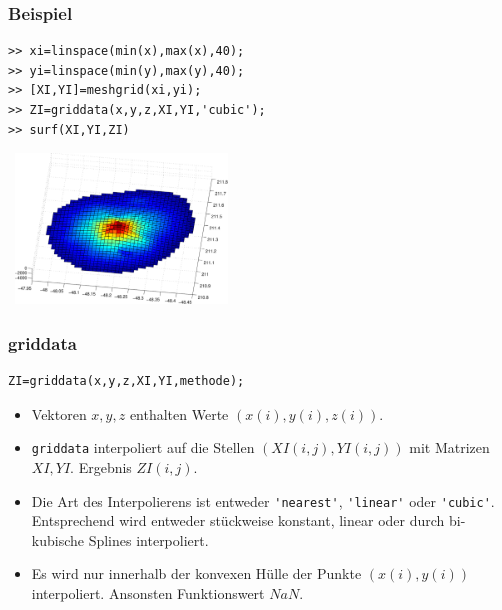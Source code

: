 \begin{frame}[fragile]\frametitle{Beispiel}
\begin{lstlisting}
>> xi=linspace(min(x),max(x),40);
>> yi=linspace(min(y),max(y),40);
>> [XI,YI]=meshgrid(xi,yi);
>> ZI=griddata(x,y,z,XI,YI,'cubic');
>> surf(XI,YI,ZI)
\end{lstlisting}
\begin{center}
\includegraphics[width=6cm, height=4cm]{./figures/beispiel_scattered_data_plot}
\end{center}
\end{frame}
%
% 
\begin{frame}[fragile]\frametitle{griddata}
\begin{lstlisting}
ZI=griddata(x,y,z,XI,YI,methode); 
\end{lstlisting}
\vspace*{-0.5cm}
{\small
\begin{itemize}
\item Vektoren $x,y,z$ enthalten Werte $(x(i),y(i),z(i))$.
\item \lstinline!griddata! interpoliert auf die Stellen $(XI(i,j),YI(i,j))$
  mit Matrizen $XI,YI$. Ergebnis $ZI(i,j)$.
\item Die Art des Interpolierens ist entweder \lstinline!'nearest'!, \lstinline!'linear'!
  oder \lstinline!'cubic'!. Entsprechend wird entweder st\"uckweise konstant, linear
  oder durch bi-kubische Splines interpoliert. 
\item Es wird nur innerhalb der konvexen H\"ulle der Punkte $(x(i),y(i))$
  interpoliert. Ansonsten Funktionswert $NaN$. 
\end{itemize}
}
\end{frame}

